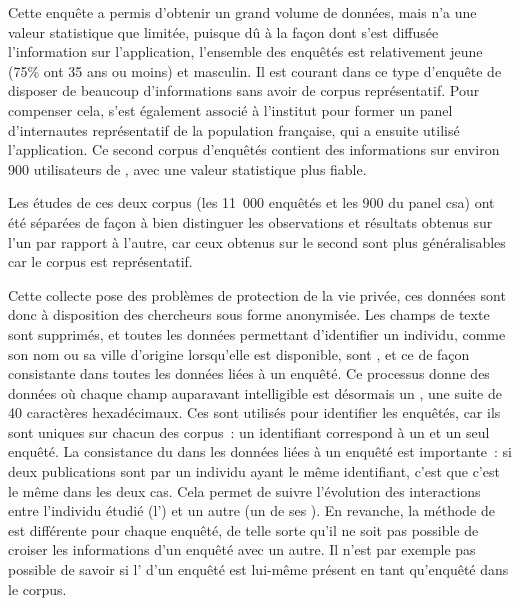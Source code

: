 Cette enquête a permis d’obtenir un grand volume de données, mais n’a une
valeur statistique que limitée, puisque dû à la façon dont s’est diffusée
l’information sur l’application, l’ensemble des enquêtés est relativement jeune
(75\% ont 35 ans ou moins) et masculin. Il est courant dans ce type d’enquête
de disposer de beaucoup d’informations sans avoir de corpus représentatif. Pour
compenser cela,  s’est également associé à l’institut 
pour former un panel d’internautes représentatif de la population française,
qui a ensuite utilisé l’application. Ce second corpus d’enquêtés contient des
informations sur environ 900 utilisateurs de \fb{}, avec une valeur statistique
plus fiable.

Les études de ces deux corpus (les 11~000 enquêtés  et les
900 du panel {\sc csa}) ont été séparées de façon à bien distinguer les
observations et résultats obtenus sur l’un par rapport à l’autre, car ceux
obtenus sur le second sont plus généralisables car le corpus est représentatif.

Cette collecte pose des problèmes de protection de la vie privée, ces données
sont donc à disposition des chercheurs sous forme anonymisée. Les champs de
texte sont supprimés, et toutes les données permettant d’identifier un
individu, comme son nom ou sa ville d’origine lorsqu’elle est disponible, sont
, et ce de façon consistante dans toutes les données liées à un
enquêté. Ce processus donne des données où chaque champ auparavant intelligible
est désormais un , une suite de 40 caractères hexadécimaux. Ces
 sont utilisés pour identifier les enquêtés, car ils sont uniques sur
chacun des corpus~: un identifiant correspond à un et un seul enquêté. La
consistance du  dans les données liées à un enquêté est importante~:
si deux publications sont  par un individu ayant le même
identifiant, c’est que c’est le même dans les deux cas. Cela permet de suivre
l’évolution des interactions entre l’individu étudié (l’) et un autre (un
de ses ). En revanche, la méthode de  est différente pour
chaque enquêté, de telle sorte qu’il ne soit pas possible de croiser les
informations d’un enquêté avec un autre. Il n’est par exemple pas possible de
savoir si l’ d’un enquêté est lui-même présent en tant qu’enquêté dans
le corpus.
